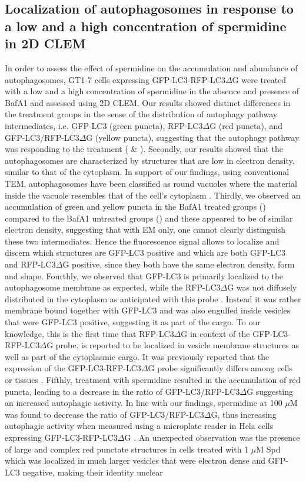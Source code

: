 \subsection{Localization of autophagosomes in response to a low and a high concentration of spermidine in 2D CLEM}
In order to assess the effect of spermidine on the accumulation and abundance of autophagosomes, GT1-7 cells expressing GFP-LC3-RFP-LC3$\Delta$G were treated with a low and a high concentration of spermidine in the absence and presence of BafA1 and assessed using 2D CLEM. Our results showed distinct differences in the treatment groups in the sense of the distribution of autophagy pathway intermediates, i.e. GFP-LC3 (green puncta), RFP-LC3$\Delta$G (red puncta), and GFP-LC3/RFP-LC3$\Delta$G (yellow puncta), suggesting that the autophagy pathway was responding to the treatment ( \& ). Secondly, our results showed that the autophagosomes are characterized by structures that are low in electron density, similar to that of the cytoplasm. In support of our findings, using conventional TEM, autophagosomes have been classified as round vacuoles where the material inside the vacuole resembles that of the cell’s cytoplasm \citep{Eskelinen2008}. Thirdly, we observed an accumulation of green and yellow puncta in the BafA1 treated groups () compared to the BafA1 untreated groups () and these appeared to be of similar electron density, suggesting that with EM only, one cannot clearly distinguish these two intermediates. Hence the fluorescence signal allows to localize and discern which structures are GFP-LC3 positive and which are both GFP-LC3 and RFP-LC3$\Delta$G positive, since they both have the same electron density, form and shape. Fourthly, we observed that GFP-LC3 is primarily localized to the autophagosome membrane as expected, while the RFP-LC3$\Delta$G was not diffusely distributed in the cytoplasm as anticipated with this probe \citep{Kaizuka2016}. Instead it was rather membrane bound together with GFP-LC3 and was also engulfed inside vesicles that were GFP-LC3 positive, suggesting it as part of the cargo. To our knowledge, this is the first time that RFP-LC3$\Delta$G in context of the GFP-LC3-RFP-LC3$\Delta$G probe, is reported to be localized in vesicle membrane structures as well as part of the cytoplasmic cargo. It was previously reported that the expression of the GFP-LC3-RFP-LC3$\Delta$G probe significantly differs among cells or tissues \citep{MoulisandVindis2017}. Fifthly, treatment with spermidine resulted in the accumulation of red puncta, leading to a decrease in the ratio of GFP-LC3/RFP-LC3$\Delta$G suggesting an increased autophagic activity. In line with our findings, spermidine at 100 $\mu$M was found to decrease the ratio of GFP-LC3/RFP-LC3$\Delta$G, thus increasing autophagic activity when measured using a microplate reader in Hela cells expressing GFP-LC3-RFP-LC3$\Delta$G \citep{Kaizuka2016}. An unexpected observation was the presence of large and complex red punctate structures in cells treated with 1 $\mu$M Spd which was localized in much larger vesicles that were electron dense and GFP-LC3 negative, making their identity unclear 